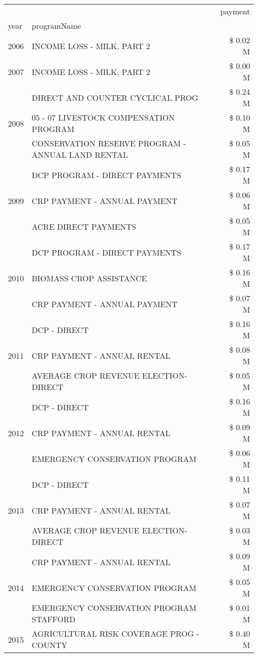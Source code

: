 \begin{tabular}{llr}
\toprule
 &  & payment \\
year & programName &  \\
\midrule
2006 & INCOME LOSS - MILK, PART 2 & \$ 0.02 M \\
\cline{1-3}
2007 & INCOME LOSS - MILK, PART 2 & \$ 0.00 M \\
\cline{1-3}
\multirow[t]{3}{*}{2008} & DIRECT AND COUNTER CYCLICAL PROG & \$ 0.24 M \\
 & 05 - 07 LIVESTOCK COMPENSATION PROGRAM & \$ 0.10 M \\
 & CONSERVATION RESERVE PROGRAM - ANNUAL LAND RENTAL & \$ 0.05 M \\
\cline{1-3}
\multirow[t]{3}{*}{2009} & DCP PROGRAM - DIRECT PAYMENTS & \$ 0.17 M \\
 & CRP PAYMENT - ANNUAL PAYMENT & \$ 0.06 M \\
 & ACRE DIRECT PAYMENTS & \$ 0.05 M \\
\cline{1-3}
\multirow[t]{3}{*}{2010} & DCP PROGRAM - DIRECT PAYMENTS & \$ 0.17 M \\
 & BIOMASS CROP ASSISTANCE & \$ 0.16 M \\
 & CRP PAYMENT - ANNUAL PAYMENT & \$ 0.07 M \\
\cline{1-3}
\multirow[t]{3}{*}{2011} & DCP - DIRECT & \$ 0.16 M \\
 & CRP PAYMENT - ANNUAL RENTAL & \$ 0.08 M \\
 & AVERAGE CROP REVENUE ELECTION-DIRECT & \$ 0.05 M \\
\cline{1-3}
\multirow[t]{3}{*}{2012} & DCP - DIRECT & \$ 0.16 M \\
 & CRP PAYMENT - ANNUAL RENTAL & \$ 0.09 M \\
 & EMERGENCY CONSERVATION PROGRAM & \$ 0.06 M \\
\cline{1-3}
\multirow[t]{3}{*}{2013} & DCP - DIRECT & \$ 0.11 M \\
 & CRP PAYMENT - ANNUAL RENTAL & \$ 0.07 M \\
 & AVERAGE CROP REVENUE ELECTION-DIRECT & \$ 0.03 M \\
\cline{1-3}
\multirow[t]{3}{*}{2014} & CRP PAYMENT - ANNUAL RENTAL & \$ 0.09 M \\
 & EMERGENCY CONSERVATION PROGRAM & \$ 0.05 M \\
 & EMERGENCY CONSERVATION PROGRAM STAFFORD & \$ 0.01 M \\
\cline{1-3}
\multirow[t]{3}{*}{2015} & AGRICULTURAL RISK COVERAGE PROG - COUNTY & \$ 0.40 M \\

\end{tabular}
